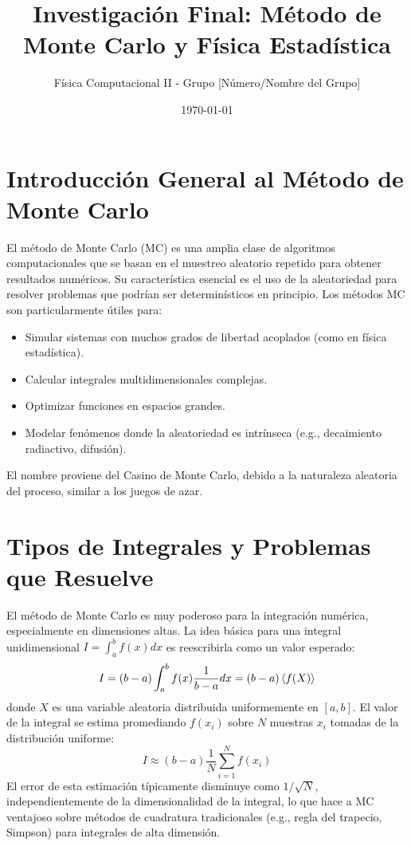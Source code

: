 \documentclass[11pt,a4paper]{article}
\title{Investigación Final: Método de Monte Carlo y Física Estadística}
\author{Física Computacional II - Grupo [Número/Nombre del Grupo]}
\date{\today}
\begin{document}
\maketitle

\section{Introducción General al Método de Monte Carlo}
El método de Monte Carlo (MC) es una amplia clase de algoritmos computacionales que se basan en el muestreo aleatorio repetido para obtener resultados numéricos. Su característica esencial es el uso de la aleatoriedad para resolver problemas que podrían ser determinísticos en principio. Los métodos MC son particularmente útiles para:
\begin{itemize}
    \item Simular sistemas con muchos grados de libertad acoplados (como en física estadística).
    \item Calcular integrales multidimensionales complejas.
    \item Optimizar funciones en espacios grandes.
    \item Modelar fenómenos donde la aleatoriedad es intrínseca (e.g., decaimiento radiactivo, difusión).
\end{itemize}
El nombre proviene del Casino de Monte Carlo, debido a la naturaleza aleatoria del proceso, similar a los juegos de azar.

\section{Tipos de Integrales y Problemas que Resuelve}
El método de Monte Carlo es muy poderoso para la integración numérica, especialmente en dimensiones altas.
La idea básica para una integral unidimensional $\displaystyle I = \int_a^b f(x) dx$ es reescribirla como un valor esperado:
\[ I = (b-a) \int_a^b f(x) \frac{1}{b-a} dx = (b-a) \expval{f(X)} \]
donde $X$ es una variable aleatoria distribuida uniformemente en $[a,b]$.
El valor de la integral se estima promediando $f(x_i)$ sobre $N$ muestras $x_i$ tomadas de la distribución uniforme:
\[ I \approx (b-a) \frac{1}{N} \sum_{i=1}^N f(x_i) \]
El error de esta estimación típicamente disminuye como $1/\sqrt{N}$, independientemente de la dimensionalidad de la integral, lo que hace a MC ventajoso sobre métodos de cuadratura tradicionales (e.g., regla del trapecio, Simpson) para integrales de alta dimensión.
\end{document}
